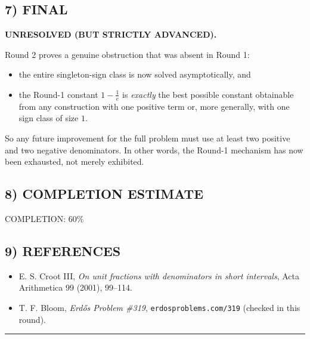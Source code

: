 \subsection*{7) FINAL}
\textbf{UNRESOLVED (BUT STRICTLY ADVANCED).}

Round 2 proves a genuine obstruction that was absent in Round 1:

\begin{itemize}
\item the entire singleton-sign class is now solved asymptotically, and
\item the Round-1 constant $1-\frac1e$ is \emph{exactly} the best possible constant obtainable from any construction with one positive term or, more generally, with one sign class of size $1$.
\end{itemize}

So any future improvement for the full problem must use at least two positive and two negative denominators.  In other words, the Round-1 mechanism has now been exhausted, not merely exhibited.

\subsection*{8) COMPLETION ESTIMATE}
COMPLETION: 60\%

\subsection*{9) REFERENCES}
\begin{itemize}
\item E. S. Croot III, \emph{On unit fractions with denominators in short intervals}, Acta Arithmetica 99 (2001), 99--114.
\item T. F. Bloom, \emph{Erd\H{o}s Problem \#319}, \texttt{erdosproblems.com/319} (checked in this round).
\end{itemize}

\bigskip
\hrule
\bigskip

